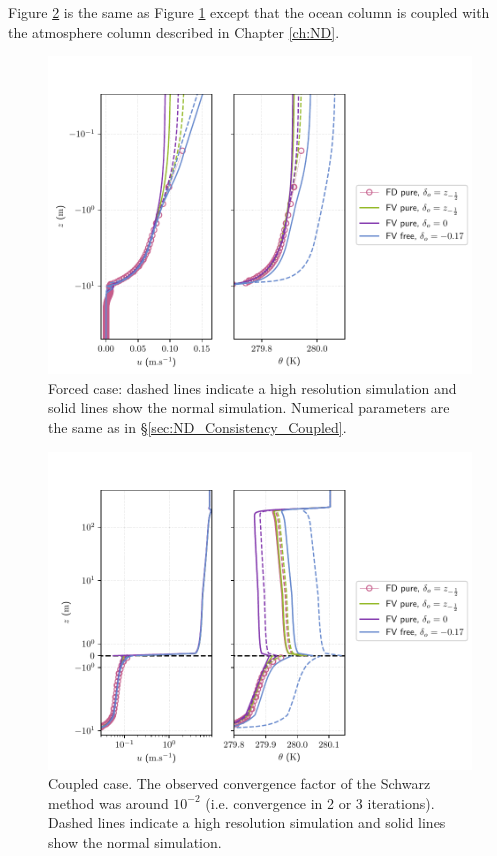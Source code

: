 Figure \ref{fig:OceanND_OSL_Coupled}
is the same as Figure 
\ref{fig:OceanND_OSL_Forced} except that the ocean column is coupled
with the atmosphere column described in Chapter \ref{ch:ND}.
\begin{figure}
	\centering
\includegraphics[scale=0.6]{images/oce_Forced.pdf}
	\caption{Forced case: dashed lines indicate
	a high resolution simulation and solid lines
	show the normal simulation. Numerical parameters
	are the same as in \S \ref{sec:ND_Consistency_Coupled}.}
	\label{fig:OceanND_OSL_Forced}
\end{figure}
\begin{figure}
	\centering
\includegraphics[scale=0.6]{images/oce_Coupled.pdf}
	\caption{Coupled case. The observed convergence factor
	of the Schwarz method was around $10^{-2}$
	(i.e. convergence in 2 or 3 iterations).
	Dashed lines indicate
	a high resolution simulation and solid lines
	show the normal simulation.}
	\label{fig:OceanND_OSL_Coupled}
\end{figure}
